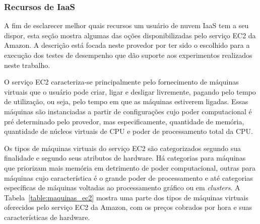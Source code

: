 \subsubsection{Recursos de IaaS}
A fim de esclarecer melhor quais recursos um usuário de nuvem IaaS tem a seu
dispor, esta seção mostra algumas das oções disponibilizadas pelo serviço EC2
da Amazon. A descrição está focada neste provedor por ter sido o escolhido para
a execução dos testes de desempenho que dão suporte aos experimentos realizados
neste trabalho.

O serviço EC2 caracteriza-se principalmente pelo fornecimento de máquinas virtuais
que o usuário pode criar, ligar e desligar livremente, pagando pelo tempo de
utilização, ou seja, pelo tempo em que as máquinas estiverem ligadas. Essas 
máquinas são instanciadas a partir de configurações cujo poder computacional é 
pré determinado pelo provedor, mas especificamente, quantidade de memória, 
quantidade de núcleos virtuais de CPU e poder de processamento total da CPU.

Os tipos de máquinas virtuais do serviço EC2 são categorizados segundo sua 
finalidade e segundo seus atributos de hardware. Há categorias para máquinas
que priorizam mais memória em detrimento de poder computacional, outras para 
máquinas cujo característica é o grande poder de processamento e até categorias
específicas de máquinas voltadas ao processamento gráfico ou em \emph{clusters}.
A Tabela~\ref{table:maquinas_ec2} mostra uma parte dos tipos de máquinas virtuais
oferecidos pelo serviço EC2 da Amazon, com os preços cobrados por hora e suas
características de hardware.


